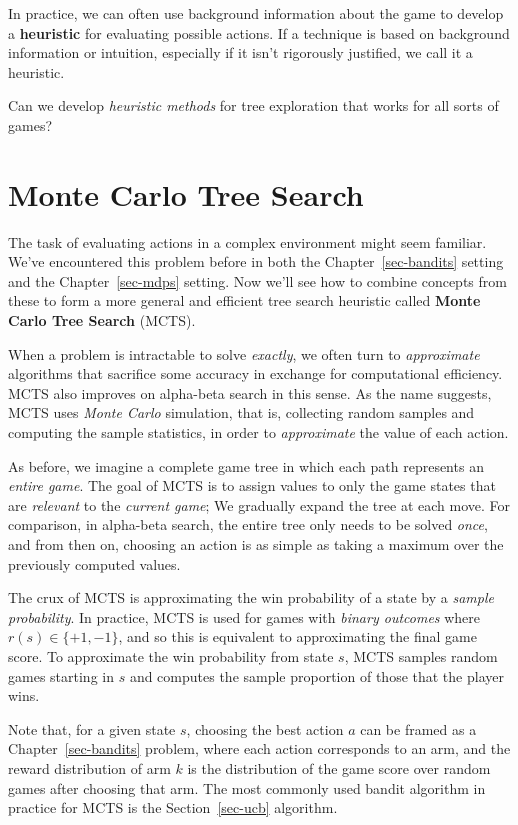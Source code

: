 \documentclass[
  letterpaper,
  DIV=11,
  numbers=noendperiod]{scrreprt}
\theoremstyle{plain}
\theoremstyle{plain}
\theoremstyle{definition}
\theoremstyle{definition}
\theoremstyle{remark}
\begin{document}
In practice, we can often use background information about the game to
develop a \textbf{heuristic} for evaluating possible actions. If a
technique is based on background information or intuition, especially if
it isn't rigorously justified, we call it a heuristic.

Can we develop \emph{heuristic methods} for tree exploration that works
for all sorts of games?

\section{Monte Carlo Tree Search}\label{sec-mcts}

The task of evaluating actions in a complex environment might seem
familiar. We've encountered this problem before in both the
Chapter~\ref{sec-bandits} setting and the Chapter~\ref{sec-mdps}
setting. Now we'll see how to combine concepts from these to form a more
general and efficient tree search heuristic called \textbf{Monte Carlo
Tree Search} (MCTS).

When a problem is intractable to solve \emph{exactly}, we often turn to
\emph{approximate} algorithms that sacrifice some accuracy in exchange
for computational efficiency. MCTS also improves on alpha-beta search in
this sense. As the name suggests, MCTS uses \emph{Monte Carlo}
simulation, that is, collecting random samples and computing the sample
statistics, in order to \emph{approximate} the value of each action.

As before, we imagine a complete game tree in which each path represents
an \emph{entire game}. The goal of MCTS is to assign values to only the
game states that are \emph{relevant} to the \emph{current game}; We
gradually expand the tree at each move. For comparison, in alpha-beta
search, the entire tree only needs to be solved \emph{once}, and from
then on, choosing an action is as simple as taking a maximum over the
previously computed values.

The crux of MCTS is approximating the win probability of a state by a
\emph{sample probability}. In practice, MCTS is used for games with
\emph{binary outcomes} where \(r(s) \in \{ +1, -1 \}\), and so this is
equivalent to approximating the final game score. To approximate the win
probability from state \(s\), MCTS samples random games starting in
\(s\) and computes the sample proportion of those that the player wins.

Note that, for a given state \(s\), choosing the best action \(a\) can
be framed as a Chapter~\ref{sec-bandits} problem, where each action
corresponds to an arm, and the reward distribution of arm \(k\) is the
distribution of the game score over random games after choosing that
arm. The most commonly used bandit algorithm in practice for MCTS is the
Section~\ref{sec-ucb} algorithm.
\end{document}
